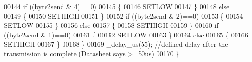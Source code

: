 \begin{DoxyCode}
00144         \textcolor{keywordflow}{if} ((byte2send & 4)==0)
00145         \{
00146             SETLOW
00147         \}
00148         \textcolor{keywordflow}{else}
00149         \{
00150             SETHIGH
00151         \}
00152         \textcolor{keywordflow}{if} ((byte2send & 2)==0)
00153         \{
00154             SETLOW
00155         \}
00156         \textcolor{keywordflow}{else}
00157         \{
00158             SETHIGH
00159         \}
00160         \textcolor{keywordflow}{if} ((byte2send & 1)==0)
00161         \{
00162             SETLOW
00163         \}
00164         \textcolor{keywordflow}{else}
00165         \{
00166             SETHIGH
00167         \}   
00168     \}
00169     \_delay\_us(55);      \textcolor{comment}{//defined delay after the transmission is complete (Datasheet says >=50us)}
00170 \}
\end{DoxyCode}
